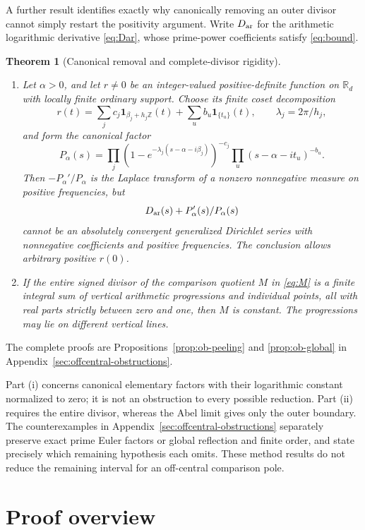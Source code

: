 \documentclass[11pt]{article}
\newtheorem{theorem}{Theorem}[section]
\theoremstyle{definition}
\theoremstyle{remark}
\newcommand{\R}{\mathbb R}
\newcommand{\Z}{\mathbb Z}
\newcommand{\one}{\mathbf 1}
\numberwithin{equation}{section}
\begin{document}
A further result identifies exactly why canonically removing an outer divisor cannot simply restart the positivity argument. Write \(D_{\rm ar}\) for the arithmetic logarithmic derivative \eqref{eq:Dar}, whose prime-power coefficients satisfy \eqref{eq:bound}.

\begin{theorem}[Canonical removal and complete-divisor rigidity]\label{thm:boundary-method}
\begin{enumerate}[label=(\roman*)]
\item Let \(\alpha>0\), and let \(r\ne0\) be an integer-valued positive-definite function on \(\R_d\) with locally finite ordinary support. Choose its finite coset decomposition
\[
r(t)=\sum_jc_j\one_{\beta_j+h_j\Z}(t)
+\sum_u b_u\one_{\{t_u\}}(t),
\qquad \lambda_j=2\pi/h_j,
\]
and form the canonical factor
\[
P_\alpha(s)=
\prod_j(1-e^{-\lambda_j(s-\alpha-i\beta_j)})^{-c_j}
\prod_u(s-\alpha-it_u)^{-b_u}.
\]
Then \(-P_\alpha'/P_\alpha\) is the Laplace transform of a nonzero nonnegative measure on positive frequencies, but
\[
D_{\rm ar}(s)+P_\alpha'(s)/P_\alpha(s)
\]
cannot be an absolutely convergent generalized Dirichlet series with nonnegative coefficients and positive frequencies. The conclusion allows arbitrary positive \(r(0)\).
\item If the entire signed divisor of the comparison quotient \(M\) in \eqref{eq:M} is a finite integral sum of vertical arithmetic progressions and individual points, all with real parts strictly between zero and one, then \(M\) is constant. The progressions may lie on different vertical lines.
\end{enumerate}
\end{theorem}

The complete proofs are Propositions~\ref{prop:ob-peeling} and \ref{prop:ob-global} in Appendix~\ref{sec:offcentral-obstructions}.

Part (i) concerns canonical elementary factors with their logarithmic constant normalized to zero; it is not an obstruction to every possible reduction. Part (ii) requires the entire divisor, whereas the Abel limit gives only the outer boundary. The counterexamples in Appendix~\ref{sec:offcentral-obstructions} separately preserve exact prime Euler factors or global reflection and finite order, and state precisely which remaining hypothesis each omits. These method results do not reduce the remaining interval for an off-central comparison pole.

\section*{Proof overview}
\end{document}

